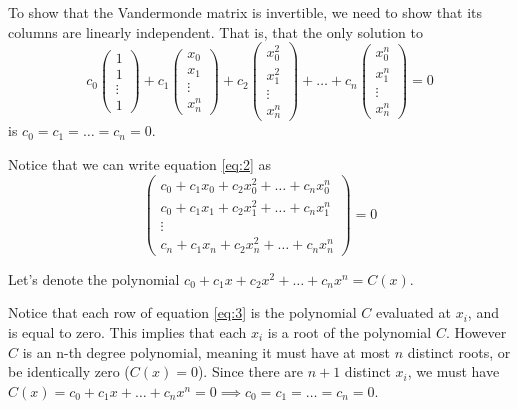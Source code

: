 \documentclass[12pt,letterpaper]{article}
\begin{document}
To show that the Vandermonde matrix is invertible, we need to show that its columns are linearly independent. That is, that the only solution to
\begin{equation} \label{eq:2}
c_0 \begin{pmatrix}
	1 \\ 1 \\ \vdots \\ 1
\end{pmatrix} +
c_1 \begin{pmatrix}
	x_0 \\ x_1 \\ \vdots \\ x_n^n
\end{pmatrix} +
c_2 \begin{pmatrix}
	x_0^2 \\ x_1^2 \\ \vdots \\ x_n^n
\end{pmatrix} + \dots +
c_n \begin{pmatrix}
	x_0^n \\ x_1^n \\ \vdots \\ x_n^n
\end{pmatrix}  = 0
\end{equation}
is $c_0 = c_1 = \dots = c_n = 0$.

Notice that we can write equation \ref{eq:2} as
\begin{equation} \label{eq:3}
\begin{pmatrix}
	c_0 + c_1 x_0 + c_2 x_0^2 + \dots + c_nx_0^n \\
	c_0 + c_1 x_1 + c_2 x_1^2 + \dots + c_nx_1^n \\
	\vdots \\
	c_n + c_1 x_n + c_2 x_n^2 + \dots + c_nx_n^n
\end{pmatrix} = 0
\end{equation}

Let's denote the polynomial $c_0 + c_1 x + c_2 x^2 + \dots + c_n x^n = C(x)$.

Notice that each row of equation \ref{eq:3} is the polynomial $C$ evaluated at $x_i$, and is equal to zero. This implies that each $x_i$ is a root of the polynomial $C$. However $C$ is an n-th degree polynomial, meaning it must have at most $n$ distinct roots, or be identically zero ($C(x)=0$). Since there are $n+1$ distinct $x_i$, we must have $C(x) = c_0 + c_1x + \dots + c_n x^n = 0 \implies c_0=c_1=\dots=c_n=0$.
\end{document}
